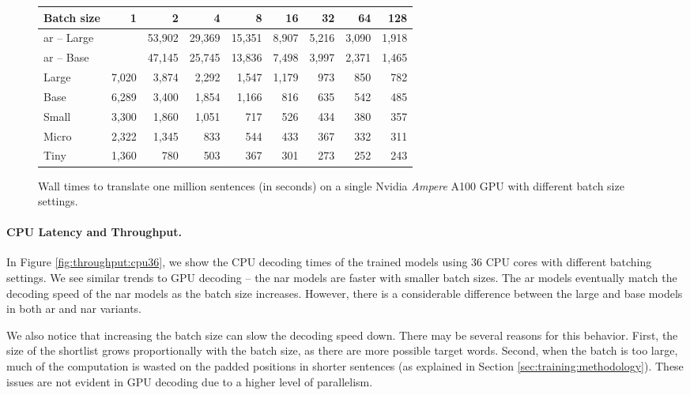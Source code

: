 \begin{figure}
  \centering

  
  \vspace{1\baselineskip}

  \begin{tabular}{lrrrrrrrr}
    \toprule
    Batch size & 1 & 2 & 4 & 8 & 16 & 32 & 64 & 128 \\
    \midrule
    \acs{ar} -- Large && 53,902 & 29,369 & 15,351 & 8,907 & 5,216 & 3,090 & 1,918 \\
    \acs{ar} -- Base  && 47,145 & 25,745 & 13,836 & 7,498 & 3,997 & 2,371 & 1,465 \\
    \midrule
    Large & 7,020 & 3,874 & 2,292 & 1,547 & 1,179 & 973 & 850 & 782 \\
    Base  & 6,289 & 3,400 & 1,854 & 1,166 &   816 & 635 & 542 & 485 \\
    Small & 3,300 & 1,860 & 1,051 &   717 &   526 & 434 & 380 & 357 \\
    Micro & 2,322 & 1,345 &   833 &   544 &   433 & 367 & 332 & 311 \\
    Tiny  & 1,360 &   780 &   503 &   367 &   301 & 273 & 252 & 243 \\
    \bottomrule
  \end{tabular}

  \caption{Wall times to translate one million sentences (in seconds) on a
    single Nvidia \emph{Ampere} A100 GPU with different batch size settings.}%
  \label{fig:throughput:a100}
\end{figure}


\paragraph{CPU Latency and Throughput.}
In Figure \ref{fig:throughput:cpu36}, we show the CPU decoding times of the
trained models using 36 CPU cores with different batching settings.  We see
similar trends to GPU decoding -- the \ac{nar} models are faster with smaller
batch sizes. The \ac{ar} models eventually match the decoding speed of the
\ac{nar} models as the batch size increases. However, there is a considerable
difference between the large and base models in both \ac{ar} and \ac{nar}
variants.

We also notice that increasing the batch size can slow the decoding speed
down. There may be several reasons for this behavior. First, the size of the
shortlist grows proportionally with the batch size, as there are more possible
target words. Second, when the batch is too large, much of the computation is
wasted on the padded positions in shorter sentences (as explained in Section
\ref{sec:training:methodology}). These issues are not evident in GPU decoding
due to a higher level of parallelism.

